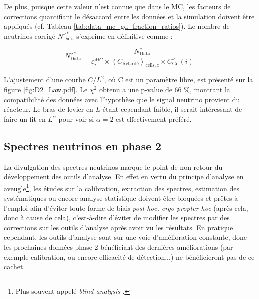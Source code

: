\bigbreak

De plus, puisque cette valeur n'est connue que dans le MC, les facteurs de corrections quantifiant le désaccord entre les données et la simulation doivent être appliqués (cf. Tableau \ref{tab:data_mc_gd_fraction_ratios}). Le nombre de neutrinos corrigé $N^{\nu *}_\textrm{Data}$ s'exprime en définitive comme :

\begin{equation}
      N^{\nu *}_\textrm{Data} = \frac{N^{\nu}_\textrm{Data}}{\varepsilon_i^{MC} \times \left<C_\textrm{Retardé} \right>_{\textrm{cells},z} \times C^\nu_\textrm{Gd}(i)}
\end{equation}

\bigbreak

L'ajustement d'une courbe $C/L^2$, où C est un paramètre libre, est présenté sur la figure \ref{fig:D2_Law.pdf}. Le $\chi^2$ obtenu a une p-value de 66 \%, montrant la compatibilité des données avec l'hypothèse que le signal neutrino provient du réacteur. Le bras de levier en $L$ étant cependant faible, il serait intéressant de faire un fit en $L^\alpha$ pour voir si $\alpha=2$ est effectivement préféré.

\bigbreak


\subsection{Spectres neutrinos en phase 2}

%
%

La divulgation des spectres neutrinos marque le point de non-retour du développement des outils d'analyse. En effet en vertu du principe d'analyse en aveugle\footnote{Plus souvent appelé \og \textit{blind analysis} \fg{}.}, les études sur la calibration, extraction des spectres, estimation des systématiques ou encore analyse statistique doivent être bloquées et prêtes à l'emploi afin d'éviter toute forme de biais  \og \textit{post-hoc, ergo propter hoc} \fg{} (après cela, donc à cause de cela), c'est-à-dire d'éviter de modifier les spectres par des corrections sur les outils d'analyse après avoir vu les résultats. En pratique cependant, les outils d'analyse sont sur une voie d'amélioration constante, donc les prochaines données phase 2 bénéficiant des dernières améliorations (par exemple calibration, ou encore efficacité de détection...) ne bénéficieront pas de ce cachet.\\

